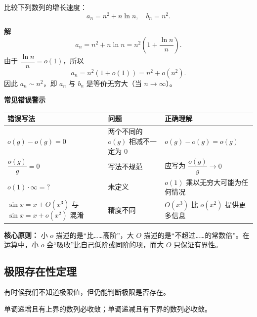 \documentclass[fontset=fandol]{ctexart}
\newenvironment{custom}[1]{\par\noindent\textbf{#1}\quad}{\par\vspace{0.8em}}
\begin{document}
\begin{example}[利用 o 和 O 比较数列增长]
比较下列数列的增长速度：
\[
a_n = n^2 + n \ln n,\quad b_n = n^2.
\]

\begin{custom}{解}
\[
a_n = n^2 + n \ln n = n^2 \left(1 + \dfrac{\ln n}{n}\right).
\]
由于 \(\dfrac{\ln n}{n} = o(1)\)，所以
\[
a_n = n^2 (1 + o(1)) = n^2 + o(n^2).
\]
因此 \(a_n \sim n^2\)，即 \(a_n\) 与 \(b_n\) 是等价无穷大（当 \(n \to \infty\)）。
\end{custom}
\end{example}

\begin{custom}{常见错误警示}

\begin{center}
\small
\begin{tabularx}{\textwidth}{|>{\raggedright\arraybackslash}X|>{\raggedright\arraybackslash}X|>{\raggedright\arraybackslash}X|}
\hline
\textbf{错误写法} & \textbf{问题} & \textbf{正确理解} \\
\hline
\(o(g) - o(g) = 0\) & 两个不同的 \(o(g)\) 相减不一定为 0 & \(o(g) - o(g) = o(g)\) \\
\hline
\(\dfrac{o(g)}{g} = 0\) & 写法不规范 & 应写为 \(\dfrac{o(g)}{g} \to 0\) \\
\hline
\(o(1) \cdot \infty = ?\) & 未定义 & \(o(1)\) 乘以无穷大可能为任何情况 \\
\hline
\(\sin x = x + O(x^3)\) 与 \(\sin x = x + o(x^2)\) 混淆 & 精度不同 & \(O(x^3)\) 比 \(o(x^2)\) 提供更多信息 \\
\hline
\end{tabularx}
\end{center}

\textbf{核心原则：} 小 \(o\) 描述的是“比……高阶”，大 \(O\) 描述的是“不超过……的常数倍”。在运算中，小 \(o\) 会“吸收”比自己低阶或同阶的项，而大 \(O\) 只保证有界性。
\end{custom}

\subsection{极限存在性定理}

有时候我们不知道极限值，但仍能判断极限是否存在。

\begin{theorem}[单调有界准则]
单调递增且有上界的数列必收敛；单调递减且有下界的数列必收敛。
\end{theorem}
\end{document}
